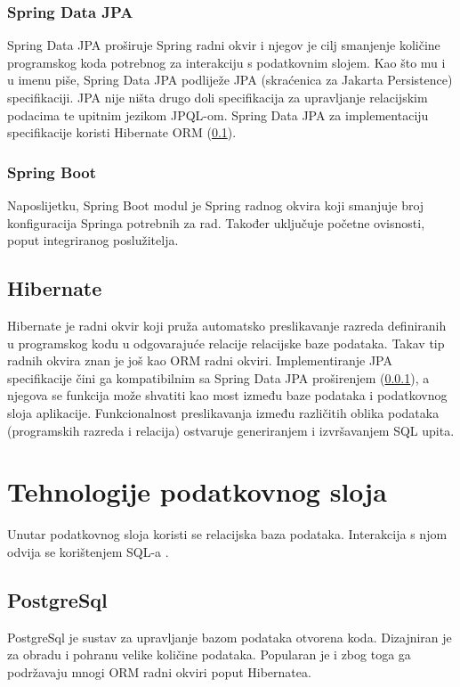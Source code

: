 \documentclass[times, utf8, zavrsni]{fer}
\begin{document}
			\subsubsection{Spring Data JPA}
			\label{subsubsec:spingdatajpa}
			Spring Data JPA proširuje Spring radni okvir i njegov je cilj smanjenje količine programskog koda potrebnog za interakciju s podatkovnim slojem. Kao što mu i u imenu piše, Spring Data JPA podliježe JPA (skraćenica za Jakarta Persistence) specifikaciji. JPA nije ništa drugo doli specifikacija za upravljanje relacijskim podacima te upitnim jezikom  JPQL-om. Spring Data JPA za implementaciju specifikacije koristi Hibernate ORM (\ref{subsec:hibernate}).\\
			\subsubsection{Spring Boot}
			Naposlijetku, Spring Boot modul je Spring radnog okvira koji smanjuje broj konfiguracija Springa potrebnih za rad. Također uključuje početne ovisnosti, poput integriranog poslužitelja.
			\subsection{Hibernate}
			\label{subsec:hibernate}
			Hibernate je radni okvir koji pruža automatsko preslikavanje razreda definiranih u programskog kodu u odgovarajuće relacije relacijske baze podataka. Takav tip radnih okvira znan je još kao ORM  radni okviri. Implementiranje JPA specifikacije čini ga kompatibilnim sa Spring Data JPA proširenjem (\ref{subsubsec:spingdatajpa}), a njegova se funkcija može shvatiti kao most između baze podataka  i podatkovnog sloja aplikacije. Funkcionalnost preslikavanja između različitih oblika podataka (programskih razreda i relacija) ostvaruje generiranjem i izvršavanjem SQL upita.
	
	
		\section{Tehnologije podatkovnog sloja}
		Unutar podatkovnog sloja koristi se relacijska baza podataka. Interakcija s njom odvija se korištenjem SQL-a .
			\subsection{PostgreSql}
			PostgreSql je sustav za upravljanje bazom podataka otvorena koda. Dizajniran je za obradu i pohranu velike količine podataka. Popularan je i zbog toga ga podržavaju mnogi ORM radni okviri poput Hibernatea.
\end{document}
